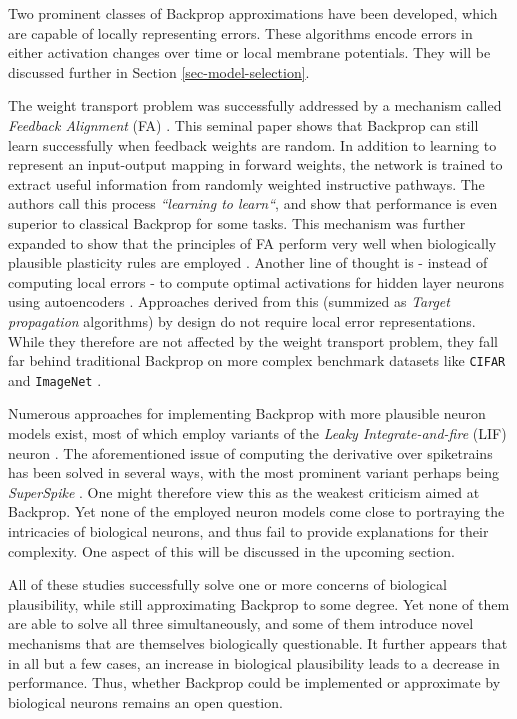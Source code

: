 Two prominent classes of Backprop approximations have been developed, which are capable of locally representing errors.
These algorithms encode errors in either activation changes over time or local membrane potentials. They will be
discussed further in Section \ref{sec-model-selection}.



\noindent The weight transport problem was successfully addressed by a mechanism called \textit{Feedback Alignment} (FA)
\citep{Lillicrap2014}. This seminal paper shows that Backprop can still learn successfully when feedback weights are
random. In addition to learning to represent an input-output mapping in forward weights, the network is trained to
extract useful information from randomly weighted instructive pathways. The authors call this process \textit{``learning
  to learn``}, and show that performance is even superior to classical Backprop for some tasks. This mechanism was further
expanded to show that the principles of FA perform very well when biologically plausible plasticity rules are employed
\citep{Liao2016,Zenke2018}. Another line of thought is - instead of computing local errors - to compute optimal
activations for hidden layer neurons using autoencoders \citep{Bengio2014,Lee2015,Ahmad2020}. Approaches derived from
this (summized as \textit{Target propagation} algorithms) by design do not require local error representations. While
they therefore are not affected by the weight transport problem, they fall far behind traditional Backprop on more
complex benchmark datasets like \texttt{CIFAR} and \texttt{ImageNet}  \citep{Bartunov2018}.

\noindent Numerous approaches for implementing Backprop with more plausible neuron models exist, most of which employ
variants of the \textit{Leaky Integrate-and-fire} (LIF) neuron \citep{Sporea2013,Lee2016,Bengio2017,Lee2020}. The
aforementioned issue of computing the derivative over spiketrains has been solved in several ways, with the most
prominent variant perhaps being \textit{SuperSpike} \citep{Zenke2018}. One might therefore view this as the weakest
criticism aimed at Backprop. Yet none of the employed neuron models come close to portraying the intricacies of
biological neurons, and thus fail to provide explanations for their complexity. One aspect of this will be discussed in
the upcoming section.

\noindent All of these studies successfully solve one or more concerns of biological plausibility, while still
approximating Backprop to some degree. Yet none of them are able to solve all three simultaneously, and some of them
introduce novel mechanisms that are themselves biologically questionable. It further appears that in all but a few
cases, an increase in biological plausibility leads to a decrease in performance. Thus, whether Backprop could be
implemented or approximate by biological neurons remains an open question.

